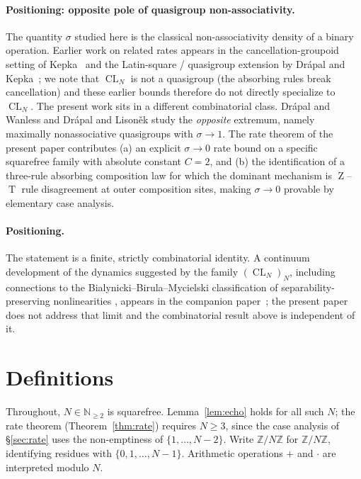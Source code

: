 \documentclass[11pt,reqno]{amsart}
\theoremstyle{plain}
\theoremstyle{definition}
\theoremstyle{remark}
\DeclareMathOperator{\CL}{CL}
\DeclareMathOperator{\HARM}{T}
\DeclareMathOperator{\VOID}{Z}
\newcommand{\ZN}{\mathbb{Z}/N\mathbb{Z}}
\newcommand{\Z}{\mathbb{Z}}
\newcommand{\N}{\mathbb{N}}
\begin{document}
\paragraph{Positioning: opposite pole of quasigroup non-associativity.}
The quantity $\sigma$ studied here is the classical
non-associativity density of a binary operation. Earlier work on
related rates appears in the cancellation-groupoid setting of
Kepka~\cite{Kepka1980} and the Latin-square / quasigroup
extension by Dr\'{a}pal and Kepka~\cite{DrapalKepka1985}; we note
that $\CL_N$ is not a quasigroup (the absorbing rules break
cancellation) and these earlier bounds therefore do not directly
specialize to $\CL_N$. The present work sits in a different
combinatorial class.
Dr\'{a}pal and Wanless \cite{DrapalWanless2021} and
Dr\'{a}pal and Lison\v{e}k \cite{DrapalLisonek2020} study the
\emph{opposite} extremum, namely maximally nonassociative
quasigroups with $\sigma\to 1$. The rate theorem of the present paper
contributes (a) an explicit $\sigma\to 0$ rate bound on a specific
squarefree family with absolute constant $C=2$, and (b) the
identification of a three-rule absorbing composition law for which
the dominant mechanism is $\VOID$--$\HARM$ rule disagreement at outer
composition sites, making $\sigma\to 0$ provable by elementary case
analysis.

\paragraph{Positioning.}
The statement is a finite, strictly combinatorial identity. A
continuum development of the dynamics suggested by the family
$(\CL_N)_{N}$, including connections to the Bialynicki--Birula--Mycielski
classification of separability-preserving nonlinearities \cite{BB1976},
appears in the companion paper~\cite{SandersGishJohnson2026JCAP}; the
present paper does not address that limit and the combinatorial result
above is independent of it.

\section{Definitions}\label{sec:def}

Throughout, $N\in\N_{\ge 2}$ is squarefree. Lemma~\ref{lem:echo}
holds for all such $N$; the rate theorem (Theorem~\ref{thm:rate})
requires $N\ge 3$, since the case analysis of \S\ref{sec:rate} uses
the non-emptiness of $\{1,\dots,N-2\}$. Write $\ZN$ for
$\Z/N\Z$, identifying residues with $\{0,1,\dots,N-1\}$. Arithmetic
operations $+$ and $\cdot$ are interpreted modulo $N$.
\end{document}
